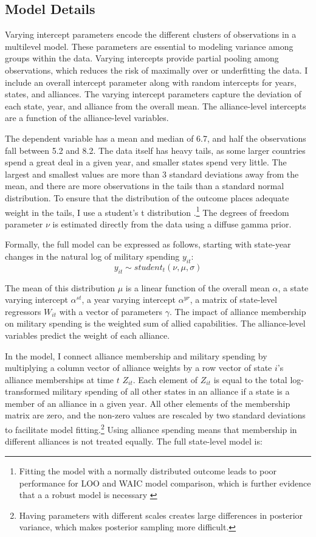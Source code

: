 \documentclass[12pt]{article}
\begin{document}
\subsection*{Model Details}

Varying intercept parameters encode the different clusters of observations in a multilevel model. These parameters are essential to modeling variance among groups within the data. Varying intercepts provide partial pooling among observations, which reduces the risk of maximally over or underfitting the data. I include an overall intercept parameter along with random intercepts for years, states, and alliances. The varying intercept parameters capture the deviation of each state, year, and alliance from the overall mean. The alliance-level intercepts are a function of the alliance-level variables. 

The dependent variable has a mean and median of 6.7, and half the observations fall between 5.2 and 8.2. The data itself has heavy tails, as some larger countries spend a great deal in a given year, and smaller states spend very little. The largest and smallest values are more than 3 standard deviations away from the mean, and there are more observations in the tails than a standard normal distribution. To ensure that the distribution of the outcome places adequate weight in the tails, I use a student's t distribution \citep{JuarezSteele2010}.\footnote{Fitting the model with a normally distributed outcome leads to poor performance for LOO and WAIC model comparison, which is further evidence that a a robust model is necessary \citep{Vehtarietal2017}}  The degrees of freedom parameter $\nu$ is estimated directly from the data using a diffuse gamma prior.

Formally, the full model can be expressed as follows, starting with state-year changes in the natural log of military spending $y_{it}$:
\begin{equation}
y_{it} \sim student_t(\nu, \mu, \sigma) 
\end{equation}

The mean of this distribution $\mu$ is a linear function of the overall mean $\alpha$, a state varying intercept $\alpha^{st}$, a year varying intercept $\alpha^{yr}$, a matrix of state-level regressors $W_{it}$ with a vector of parameters $\gamma$. The impact of alliance membership on military spending is the weighted sum of allied capabilities. The alliance-level variables predict the weight of each alliance. 

In the model, I connect alliance membership and military spending by multiplying a column vector of alliance weights by a row vector of state $i$'s alliance memberships at time $t$ $Z_{it}$. Each element of $Z_{it}$ is equal to the total log-transformed military spending of all other states in an alliance if a state is a member of an alliance in a given year. All other elements of the membership matrix are zero, and the non-zero values are rescaled by two standard deviations to facilitate model fitting.\footnote{Having parameters with different scales creates large differences in posterior variance, which makes posterior sampling more difficult.} Using alliance spending means that membership in different alliances is not treated equally. The full state-level model is:
\end{document}
